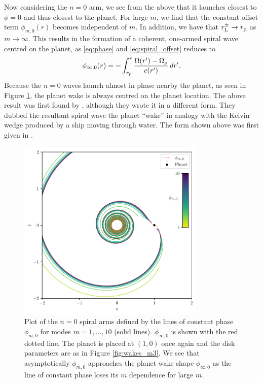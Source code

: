 Now considering the $n=0$ arm, we see from the above that it launches closest to $\phi=0$ and thus closest to the planet.
For large $m$, we find that the constant offset term $\phi_{m,0}(r)$ becomes independent of $m$.
In addition, we have that $r_{\rm L}^\pm \rightarrow r_{\rm p}$ as $m \rightarrow \infty$.
This results in the formation of a coherent, one-armed spiral wave centred on the planet, as \ref{eq:phase} and \ref{eq:spiral_offset} reduces to
\begin{align}
    \phi_{\infty,0}(r) = - \int_{r_{\rm p}}^ r \frac{\Omega(r') - \Omega_{\rm p}}{c(r')} \, dr'. \label{eq:planet_wake}
\end{align}
Because the $n=0$ waves launch almost in phase nearby the planet, as seen in Figure \ref{fig:planet_wake}, the planet wake is always centred on the planet location. 
The above result was first found by \citet{ogilvie2002}, although they wrote it in a different form. 
They dubbed the resultant spiral wave the planet ``wake'' in analogy with the Kelvin wedge produced by a ship moving through water.
The form shown above was first given in \citet{rafikov2002a}.

\begin{figure}
    \centering
    \includegraphics[width = 0.8\textwidth]{figures/planet_wake_shape.pdf}
    \caption{Plot of the $n=0$ spiral arms defined by the lines of constant phase $\phi_{m,0}$ for modes $m=1,...,10$ (solid lines).
    $\phi_{\infty,0}$ is shown with the red dotted line.
    The planet is placed at $(1,0)$ once again and the disk parameters are as in Figure \ref{fig:wakes_m3}.
    We see that asymptotically $\phi_{m,0}$ approaches the planet wake shape $\phi_{\infty,0}$ as the line of constant phase loses its $m$ dependence for large $m$.}
    \label{fig:planet_wake}
\end{figure}

